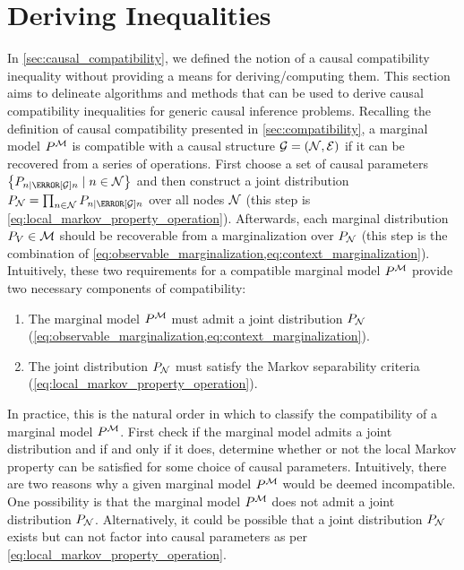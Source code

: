 \documentclass[aps, 10pt, english, twoside, pra, nofootinbib, tightenlines, longbibliography]{revtex4-1}
\begin{document}
    \section{Deriving Inequalities}
    \label{sec:deriving_inequalities}

    In \cref{sec:causal_compatibility}, we defined the notion of a causal compatibility inequality without providing a means for deriving/computing them. This section aims to delineate algorithms and methods that can be used to derive causal compatibility inequalities for generic causal inference problems. Recalling the definition of causal compatibility presented in \cref{sec:compatibility}, a marginal model $\prob^{\mscenario}$ is compatible with a causal structure $\graph = \br{\nodes, \edges}$ if it can be recovered from a series of operations. First choose a set of causal parameters $\bc{\prob[n\mid\Pa[\graph]{n}] \mid n \in \nodes}$ and then construct a joint distribution $\prob[\nodes] = \prod_{n \in \nodes} \prob[n \mid \Pa[\graph]{n}]$ over all nodes $\mathcal{N}$ (this step is \cref{eq:local_markov_property_operation}). Afterwards, each marginal distribution $\prob[V] \in \mscenario$ should be recoverable from a marginalization over $\prob[\nodes]$ (this step is the combination of \cref{eq:observable_marginalization,eq:context_marginalization}). Intuitively, these two requirements for a compatible marginal model $\prob^{\mscenario}$ provide two necessary components of compatibility:
    \begin{enumerate}
        \item The marginal model $\prob^{\mscenario}$ must admit a joint distribution $\prob[\nodes]$ (\cref{eq:observable_marginalization,eq:context_marginalization}).
        \item The joint distribution $\prob[\nodes]$ must satisfy the Markov separability criteria (\cref{eq:local_markov_property_operation}).
    \end{enumerate}
    In practice, this is the natural order in which to classify the compatibility of a marginal model $\prob^{\mscenario}$. First check if the marginal model admits a joint distribution and if and only if it does, determine whether or not the local Markov property can be satisfied for some choice of causal parameters. Intuitively, there are two reasons why a given marginal model $\prob^{\mscenario}$ would be deemed incompatible. One possibility is that the marginal model $\prob^{\mscenario}$ does not admit a joint distribution $\prob[\nodes]$. Alternatively, it could be possible that a joint distribution $\prob[\nodes]$ exists but can not factor into causal parameters as per \cref{eq:local_markov_property_operation}.
\end{document}
